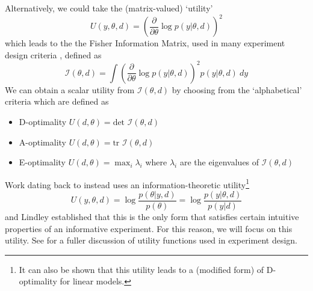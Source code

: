 Alternatively, we could take the (matrix-valued) `utility'
\begin{equation}
	U(y, \theta, d) = \left( \frac{\partial}{\partial \theta} \log p(y | \theta, d) \right)^2
\end{equation}
which leads to the the Fisher Information Matrix, used in many experiment design criteria \cite{pronzato2010}, defined as
\begin{equation}
	\mathcal{I}(\theta, d) = \int \left( \frac{\partial}{\partial \theta} \log p(y | \theta, d) \right)^2 p(y | \theta, d)\ dy
\end{equation}
We can obtain a scalar utility from $\mathcal{I}(\theta, d)$ by choosing from the `alphabetical' criteria \cite{box1982} which are defined as
\begin{itemize}
	\item D-optimality $U(d, \theta) = \text{det } \mathcal{I}(\theta, d)$
	\item A-optimality $U(d, \theta) = \text{tr } \mathcal{I}(\theta, d)$
	\item E-optimality $U(d, \theta) = \max_i \lambda_i$ where $\lambda_i$ are the eigenvalues of $\mathcal{I}(\theta, d)$
\end{itemize}

Work dating back to \cite{lindley1956} instead uses an information-theoretic utility\footnote{It can also be shown \cite{chaloner1995} that this utility leads to a (modified form) of D-optimality for linear models.}
\begin{equation}
	U(y, \theta, d) = \log \frac{p(\theta | y, d)}{p(\theta)} = \log \frac{p(y | \theta, d)}{p(y|d)}
\end{equation}
and Lindley established that this is the only form that satisfies certain intuitive properties of an informative experiment. For this reason, we will focus on this utility. See \cite{chaloner1995, ryanreview} for a fuller discussion of utility functions used in experiment design.

